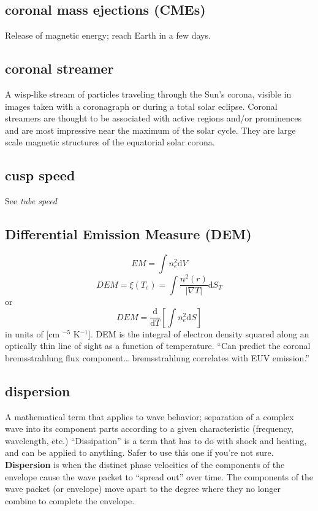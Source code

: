 \documentclass{article}
\begin{document}
\subsection{coronal mass ejections (CMEs)}
Release of magnetic energy; reach Earth in a few days.

\subsection{coronal streamer}
A wisp-like stream of particles traveling through the Sun's corona, visible
in images taken with a coronagraph or during a total solar eclipse. Coronal
streamers are thought to be associated with active regions and/or
prominences and are most impressive near the maximum of the solar cycle.
They are large scale magnetic structures of the equatorial solar corona.

\subsection{cusp speed}
See \emph{tube speed}

\subsection{Differential Emission Measure (DEM)}
\[
    EM = \int{n_{e}^{2}\mathrm{d}V}
    \]
\[
    DEM = \xi(T_{e}) = \int{\frac{n^{2}(r)}{|\nabla{T}|}\mathrm{d}S_{T}}
    \]
or
\[
    DEM = \frac{\mathrm{d}}{\mathrm{d}T}\left[\int{n_{e}^{2}\mathrm{d}S}\right]
    \]
in units of [cm ${^{-5}}$ K${^{-1}}$]. DEM is the integral of electron
density squared along an optically thin line of sight as a function of
temperature.
``Can predict the coronal bremsstrahlung flux component\ldots
bremsstrahlung correlates with EUV emission.''

\subsection{dispersion}
A mathematical term that applies to wave behavior; separation of a complex
wave into its component parts according to a given characteristic
(frequency, wavelength, etc.) ``Dissipation'' is a term that has to do with
shock and heating, and can be applied to anything. Safer to use this one
if you're not sure.
\textbf{Dispersion} is when the distinct phase velocities of the components of the
envelope cause the wave packet to ``spread out'' over time.
The components of the wave packet (or envelope) move apart to the degree
where they no longer combine to complete the envelope.
\end{document}
